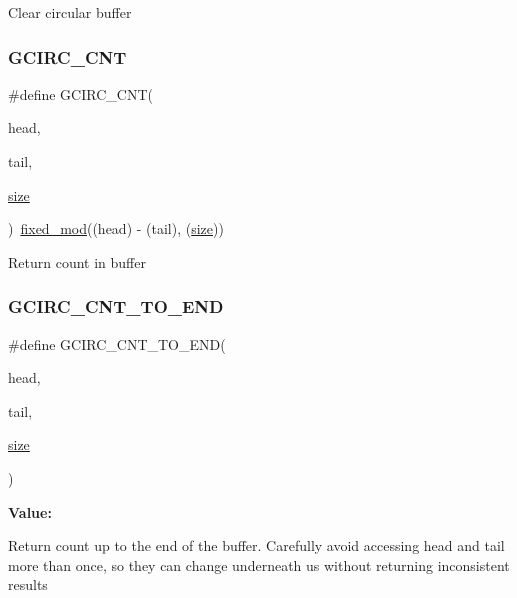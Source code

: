 Clear circular buffer \mbox{\label{group__gmacd__defines_gaf979fcaac59bf6578901fc3fa40c7255}} 
\subsubsection{\texorpdfstring{GCIRC\_CNT}{GCIRC\_CNT}}
{\footnotesize\ttfamily \#define G\+C\+I\+R\+C\+\_\+\+C\+NT(\begin{DoxyParamCaption}\item[{}]{head,  }\item[{}]{tail,  }\item[{}]{\mbox{\hyperlink{sun4u_2tte_8h_a245260f6f74972558f61b85227df5aae}{size}} }\end{DoxyParamCaption})~\mbox{\hyperlink{group__gmacd__defines_gaf792223e30acf40b9e7a67f080f807e8}{fixed\+\_\+mod}}((head) -\/ (tail), (\mbox{\hyperlink{sun4u_2tte_8h_a245260f6f74972558f61b85227df5aae}{size}}))}

Return count in buffer \mbox{\label{group__gmacd__defines_gac9926ea92f8ad62f870aaf51552e3cd9}} 
\subsubsection{\texorpdfstring{GCIRC\_CNT\_TO\_END}{GCIRC\_CNT\_TO\_END}}
{\footnotesize\ttfamily \#define G\+C\+I\+R\+C\+\_\+\+C\+N\+T\+\_\+\+T\+O\+\_\+\+E\+ND(\begin{DoxyParamCaption}\item[{}]{head,  }\item[{}]{tail,  }\item[{}]{\mbox{\hyperlink{sun4u_2tte_8h_a245260f6f74972558f61b85227df5aae}{size}} }\end{DoxyParamCaption})}

{\bfseries Value\+:}
\begin{DoxyCode}{0}

\end{DoxyCode}
Return count up to the end of the buffer. Carefully avoid accessing head and tail more than once, so they can change underneath us without returning inconsistent results \mbox{\label{group__gmacd__defines_gafa316fca6188ee1324fca3acb10326a5}} 
